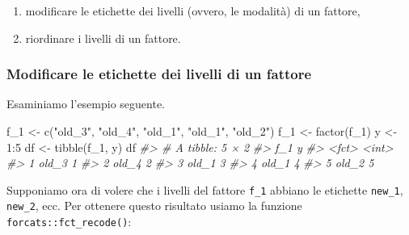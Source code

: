 \documentclass[
  10pt,
  italian,
  a4paper,
  extrafontsizes,onecolumn,openright
  ]{memoir}
\newenvironment{Shaded}{\begin{snugshade}}{\end{snugshade}}
\newcommand{\CommentTok}[1]{\textcolor[rgb]{0.56,0.35,0.01}{\textit{#1}}}
\newcommand{\DecValTok}[1]{\textcolor[rgb]{0.00,0.00,0.81}{#1}}
\newcommand{\FunctionTok}[1]{\textcolor[rgb]{0.00,0.00,0.00}{#1}}
\newcommand{\NormalTok}[1]{#1}
\newcommand{\OtherTok}[1]{\textcolor[rgb]{0.56,0.35,0.01}{#1}}
\newcommand{\SpecialCharTok}[1]{\textcolor[rgb]{0.00,0.00,0.00}{#1}}
\newcommand{\StringTok}[1]{\textcolor[rgb]{0.31,0.60,0.02}{#1}}
\providecommand{\tightlist}{%
  \setlength{\itemsep}{0pt}\setlength{\parskip}{0pt}}
\begin{document}
\begin{enumerate}
\def\labelenumi{\arabic{enumi}.}
\tightlist
\item
  modificare le etichette dei livelli (ovvero, le modalità) di un fattore,
\item
  riordinare i livelli di un fattore.
\end{enumerate}

\hypertarget{modificare-le-etichette-dei-livelli-di-un-fattore}{%
\subsubsection{Modificare le etichette dei livelli di un fattore}\label{modificare-le-etichette-dei-livelli-di-un-fattore}}

Esaminiamo l'esempio seguente.

\begin{Shaded}
\begin{Highlighting}[]
\NormalTok{f\_1 }\OtherTok{\textless{}{-}} \FunctionTok{c}\NormalTok{(}\StringTok{"old\_3"}\NormalTok{, }\StringTok{"old\_4"}\NormalTok{, }\StringTok{"old\_1"}\NormalTok{, }\StringTok{"old\_1"}\NormalTok{, }\StringTok{"old\_2"}\NormalTok{)}
\NormalTok{f\_1 }\OtherTok{\textless{}{-}} \FunctionTok{factor}\NormalTok{(f\_1)}
\NormalTok{y }\OtherTok{\textless{}{-}} \DecValTok{1}\SpecialCharTok{:}\DecValTok{5}
\NormalTok{df }\OtherTok{\textless{}{-}} \FunctionTok{tibble}\NormalTok{(f\_1, y)}
\NormalTok{df}
\CommentTok{\#\textgreater{} \# A tibble: 5 × 2}
\CommentTok{\#\textgreater{}   f\_1       y}
\CommentTok{\#\textgreater{}   \textless{}fct\textgreater{} \textless{}int\textgreater{}}
\CommentTok{\#\textgreater{} 1 old\_3     1}
\CommentTok{\#\textgreater{} 2 old\_4     2}
\CommentTok{\#\textgreater{} 3 old\_1     3}
\CommentTok{\#\textgreater{} 4 old\_1     4}
\CommentTok{\#\textgreater{} 5 old\_2     5}
\end{Highlighting}
\end{Shaded}

\noindent
Supponiamo ora di volere che i livelli del fattore \texttt{f\_1} abbiano le etichette \texttt{new\_1}, \texttt{new\_2}, ecc. Per ottenere questo risultato usiamo la funzione \texttt{forcats::fct\_recode()}:
\end{document}
